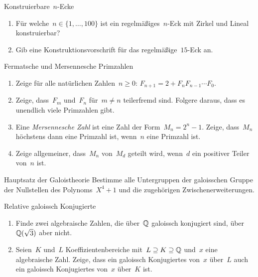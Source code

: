 \documentclass{algblatt}
\begin{document}
\vspace*{-1.5cm}

\begin{aufgabe}{Konstruierbare~$n$-Ecke}
\begin{enumerate}
\item Für welche~$n \in \{ 1,\ldots,100 \}$ ist ein regelmäßiges~$n$-Eck
mit Zirkel und Lineal konstruierbar?
\item Gib eine Konstruktionsvorschrift für das regelmäßige~$15$-Eck an.
\end{enumerate}
\end{aufgabe}

\begin{aufgabe}{Fermatsche und Mersennesche Primzahlen}
\begin{enumerate}
\item Zeige für alle natürlichen Zahlen~$n \geq 0$: $F_{n+1} = 2 + F_n F_{n-1}
\cdots F_0$.
\item Zeige, dass~$F_m$ und~$F_n$ für~$m \neq n$ teilerfremd sind. Folgere
daraus, dass es unendlich viele Primzahlen gibt.
\item Eine \emph{Mersennesche Zahl} ist eine Zahl der Form~$M_n = 2^n -
1$. Zeige, dass~$M_n$ höchstens dann eine Primzahl ist, wenn~$n$ eine Primzahl
ist.
\item Zeige allgemeiner, dass~$M_n$ von~$M_d$ geteilt wird, wenn~$d$ ein
positiver Teiler von~$n$ ist.
\end{enumerate}
\end{aufgabe}

\begin{aufgabe}{Hauptsatz der Galoistheorie}
Bestimme alle Untergruppen der galoisschen Gruppe der Nullstellen des
Polynoms~$X^4 + 1$ und die zugehörigen Zwischenerweiterungen.
\end{aufgabe}

\begin{aufgabe}{Relative galoissch Konjugierte}
\begin{enumerate}
\item Finde zwei algebraische Zahlen, die über~$\mathbb{Q}$ galoissch konjugiert sind,
über~$\mathbb{Q}(\sqrt{3})$ aber nicht.
\item Seien~$K$ und~$L$ Koeffizientenbereiche mit~$L \supseteq K \supseteq
\mathbb{Q}$ und~$x$ eine algebraische Zahl. Zeige, dass ein galoissch Konjugiertes
von~$x$ über~$L$ auch ein galoissch Konjugiertes von~$x$ über~$K$ ist.
\end{enumerate}
\end{aufgabe}
\end{document}
